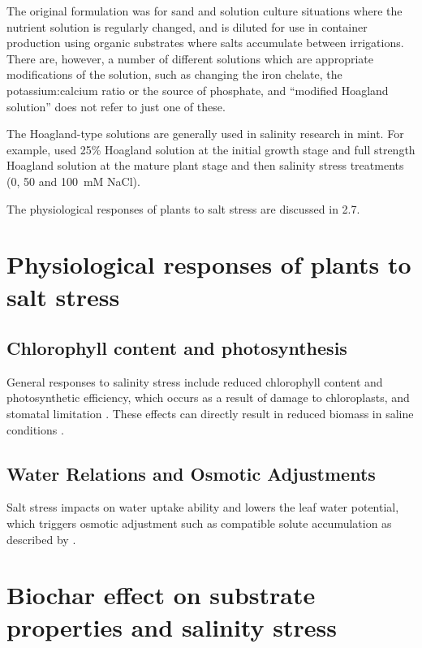 The original formulation was for sand and solution culture situations where the nutrient solution is regularly changed, and is diluted for use in container production using organic substrates where salts accumulate between irrigations. There are, however, a number of different solutions which are appropriate modifications of the solution, such as changing the iron chelate, the potassium:calcium ratio or the source of phosphate, and ``modified Hoagland solution'' does not refer to just one of these.

The Hoagland-type solutions are generally used in salinity research in mint. For example, \textcite{Morshedloo2025} used 25\% Hoagland solution at the initial growth stage and full strength Hoagland solution at the mature plant stage and then salinity stress treatments (0, 50 and 100~mM NaCl).

The physiological responses of plants to salt stress are discussed in 2.7.

\section{Physiological responses of plants to salt stress}

\subsection{Chlorophyll content and photosynthesis}

General responses to salinity stress include reduced chlorophyll content and photosynthetic efficiency, which occurs as a result of damage to chloroplasts, and stomatal limitation \parencite{Kalaji2021}. These effects can directly result in reduced biomass in saline conditions \parencite{MunnsTester2008}.

\subsection{Water Relations and Osmotic Adjustments}

Salt stress impacts on water uptake ability and lowers the leaf water potential, which triggers osmotic adjustment such as compatible solute accumulation as described by \textcite{AcostaMotos2017}.

\section{Biochar effect on substrate properties and salinity stress}

